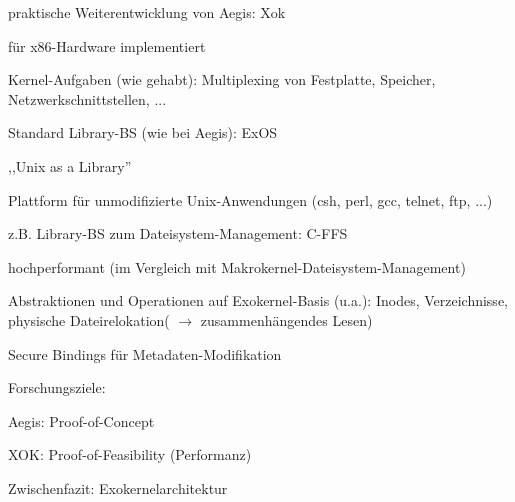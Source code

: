 \documentclass[a4paper]{article}
\begin{document}
\begin{multicols}{3}
    \begin{itemize*}
        \item
        praktische Weiterentwicklung von Aegis: Xok
        \item
        für x86-Hardware implementiert
        \item
        Kernel-Aufgaben (wie gehabt): Multiplexing von Festplatte, Speicher,
        Netzwerkschnittstellen, ...
        \item
        Standard Library-BS (wie bei Aegis): ExOS
        \begin{itemize*}
            \item ,,Unix as a Library''
            \item Plattform für unmodifizierte Unix-Anwendungen (csh, perl, gcc, telnet, ftp, ...)
        \end{itemize*}
        \item
        z.B. Library-BS zum Dateisystem-Management: C-FFS
        \begin{itemize*}
            \item hochperformant (im Vergleich mit Makrokernel-Dateisystem-Management)
            \item Abstraktionen und Operationen auf Exokernel-Basis (u.a.): Inodes, Verzeichnisse, physische Dateirelokation( $\rightarrow$ zusammenhängendes Lesen)
            \item Secure Bindings für Metadaten-Modifikation
        \end{itemize*}
        \item
        Forschungsziele:
        \begin{itemize*}
            \item Aegis: Proof-of-Concept
            \item XOK: Proof-of-Feasibility (Performanz)
        \end{itemize*}
    \end{itemize*}

    Zwischenfazit: Exokernelarchitektur


\end{multicols}
\end{document}
